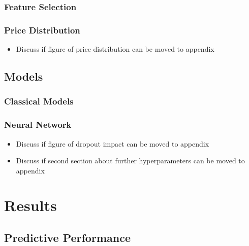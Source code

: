 \documentclass[12pt, letterpaper]{article}
\begin{document}
\subsubsection{Feature Selection} %

\subsubsection{Price Distribution} %

\begin{itemize}
    \item Discuss if figure of price distribution can be moved to appendix
\end{itemize}



\subsection{Models} %

\subsubsection{Classical Models} %

\subsubsection{Neural Network} %

\begin{itemize}
    \item Discuss if figure of dropout impact can be moved to appendix
    \item Discuss if second section about further hyperparameters can be moved to appendix
\end{itemize}



\section{Results} %


\subsection{Predictive Performance} %
\end{document}
